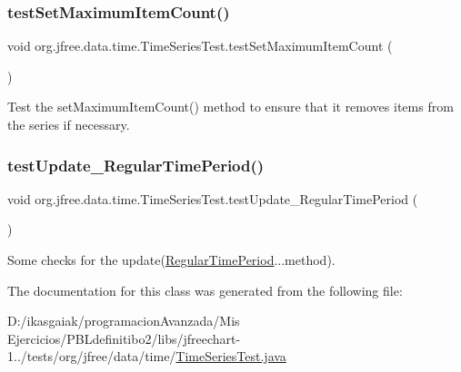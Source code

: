 \mbox{\label{classorg_1_1jfree_1_1data_1_1time_1_1_time_series_test_a4a972d98b806952a9d0c8681d1017c29}} 
\subsubsection{\texorpdfstring{test\+Set\+Maximum\+Item\+Count()}{testSetMaximumItemCount()}}
{\footnotesize\ttfamily void org.\+jfree.\+data.\+time.\+Time\+Series\+Test.\+test\+Set\+Maximum\+Item\+Count (\begin{DoxyParamCaption}{ }\end{DoxyParamCaption})}

Test the set\+Maximum\+Item\+Count() method to ensure that it removes items from the series if necessary. \mbox{\label{classorg_1_1jfree_1_1data_1_1time_1_1_time_series_test_a94f3a27a735abc3f63f78a0f83d488ef}} 
\subsubsection{\texorpdfstring{test\+Update\+\_\+\+Regular\+Time\+Period()}{testUpdate\_RegularTimePeriod()}}
{\footnotesize\ttfamily void org.\+jfree.\+data.\+time.\+Time\+Series\+Test.\+test\+Update\+\_\+\+Regular\+Time\+Period (\begin{DoxyParamCaption}{ }\end{DoxyParamCaption})}

Some checks for the update(\mbox{\hyperlink{classorg_1_1jfree_1_1data_1_1time_1_1_regular_time_period}{Regular\+Time\+Period}}...method). 

The documentation for this class was generated from the following file\+:\begin{DoxyCompactItemize}
\item 
D\+:/ikasgaiak/programacion\+Avanzada/\+Mis Ejercicios/\+P\+B\+Ldefinitibo2/libs/jfreechart-\/1../tests/org/jfree/data/time/\mbox{\hyperlink{_time_series_test_8java}{Time\+Series\+Test.\+java}}\end{DoxyCompactItemize}
